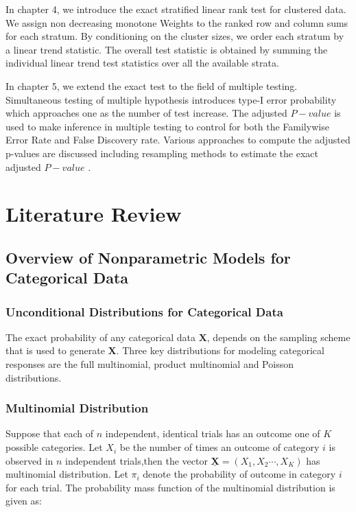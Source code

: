 \documentclass[12pt,oneside]{report}
\theoremstyle{definition}
\theoremstyle{mystyle}
\begin{document}
In chapter 4, we introduce the exact stratified linear rank test for clustered data. We assign non decreasing monotone Weights to the ranked  row and column sums  for each stratum. By conditioning on the cluster sizes, we order each stratum by a linear trend statistic. The overall test statistic is obtained by summing the individual linear trend test statistics over all the available  strata.

In chapter 5, we extend the exact test to the field  of multiple testing. Simultaneous testing of multiple hypothesis introduces  type-I error probability  which approaches one  as the number of test increase. The adjusted $P-value$  is  used to make inference in multiple testing to control for both the Familywise Error Rate and  False Discovery rate. Various approaches to compute the adjusted p-values are discussed including resampling methods to estimate  the exact adjusted $P-value$ .
\newpage

\chapter{Literature Review}
\section{Overview of Nonparametric Models for Categorical Data}
 

\subsection{Unconditional Distributions for Categorical Data}
The exact probability of any categorical data $\textbf{X}$, depends on the sampling scheme that is used to generate $\textbf{X}$. Three key distributions for modeling categorical responses are  the full multinomial, product multinomial and Poisson distributions.
\subsection{Multinomial Distribution}	
Suppose that each of $n$ independent, identical trials has  an outcome one of  $K$ possible categories. Let $X_{i}$ be the number of times an outcome of category $i$ is observed in $n$ independent trials,then  the vector $\underline{\textbf{X}}=(X_{1},X_{2}\cdots,X_{K})$ has multinomial distribution. Let $\pi_{i}$ denote the probability of outcome in category $i$ for each trial. The probability mass function of the multinomial distribution is given as:\\
\end{document}
